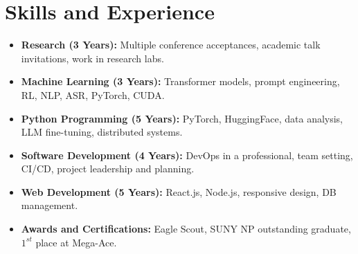 \documentclass[11pt]{article}
\begin{document}
\section*{Skills and Experience}
\begin{itemize}
    \itemsep0em
    
    \item \textbf{Research (3 Years):} Multiple conference acceptances, academic talk invitations, work in research labs.
    \item \textbf{Machine Learning (3 Years):} Transformer models, prompt engineering, RL, NLP, ASR, PyTorch, CUDA.
    \item \textbf{Python Programming (5 Years):} PyTorch, HuggingFace, data analysis, LLM fine-tuning, distributed systems.
    \item \textbf{Software Development (4 Years):} DevOps in a professional, team setting, CI/CD, project leadership and planning.
    \item \textbf{Web Development (5 Years):} React.js, Node.js, responsive design, DB management.
    \item \textbf{Awards and Certifications:} Eagle Scout, SUNY NP outstanding graduate, $1^{st}$ place at Mega-Ace.

\end{itemize}
\end{document}
